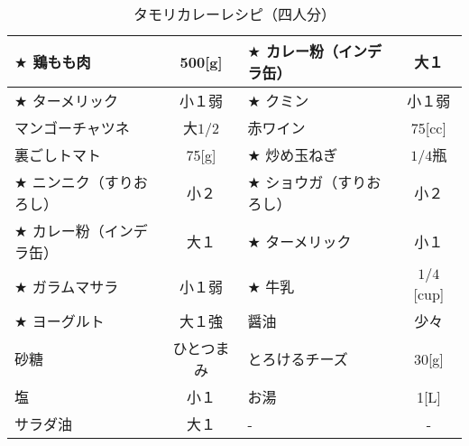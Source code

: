 \documentclass{jarticle}
\begin{document}
\begin{table}
   
    \centering
    \caption{タモリカレーレシピ（四人分）}
    \label{tab:hogehoge}
    \begin {tabular}{|l|c||l|c|}
        \hline
         $\bigstar$ 鶏もも肉 & 500[g] & $\bigstar$ カレー粉（インデラ缶） & 大１ \\ \hline
         $\bigstar$ ターメリック & 小１弱 & $\bigstar$ クミン & 小１弱 \\ \hline
         マンゴーチャツネ & 大$1/2$ & 赤ワイン & 75[cc] \\ \hline
         裏ごしトマト & 75[g] & $\bigstar$ 炒め玉ねぎ & $1/4$瓶 \\ \hline
         $\bigstar$ ニンニク（すりおろし） & 小２ & $\bigstar$ ショウガ（すりおろし） & 小２ \\ \hline
         $\bigstar$ カレー粉（インデラ缶） & 大１ & $\bigstar$ ターメリック & 小１ \\ \hline
         $\bigstar$ ガラムマサラ & 小１弱 & $\bigstar$ 牛乳 & $1/4$ [cup]\\ \hline
         $\bigstar$ ヨーグルト & 大１強 & 醤油 & 少々 \\ \hline
         砂糖 & ひとつまみ & とろけるチーズ & 30[g] \\ \hline
         塩 & 小１ & お湯 & 1[L] \\ \hline
         サラダ油 & 大１ & - & - \\
        \hline
    \end{tabular}
    
\end{table}
\end{document}
